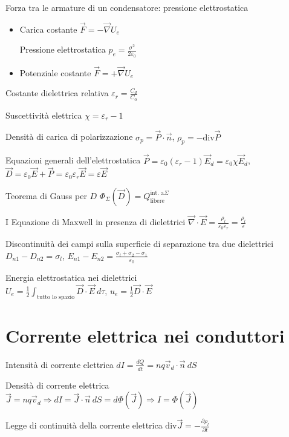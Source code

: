 \documentclass[10pt,a4paper]{article}
\begin{document}
\begin{multicols}{2}
Forza tra le armature di un condensatore: pressione elettrostatica
\begin{itemize}
\item Carica costante $\vec{F} =-\vec{\nabla } U_{e}$

Pressione elettrostatica $p_{e} =\frac{\sigma ^{2}}{2\varepsilon _{0}}$
\item Potenziale costante $\vec{F} =+\vec{\nabla } U_{e}$
\end{itemize}

Costante dielettrica relativa $\varepsilon _{r} =\frac{C_{d}}{C_{0}}$

Suscettività elettrica $\chi =\varepsilon _{r} -1$

Densità di carica di polarizzazione $\sigma _{p} =\vec{P} \cdot \vec{n}$, $\rho _{p} =-\text{div}\vec{P}$

Equazioni generali dell'elettrostatica $\vec{P} =\varepsilon _{0} (\varepsilon _{r} -1)\vec{E}_{d} =\varepsilon _{0} \chi \vec{E}_{d}$, $\vec{D} =\varepsilon _{0}\vec{E} +\vec{P} =\varepsilon _{0} \varepsilon _{r}\vec{E} =\varepsilon \vec{E}$

Teorema di Gauss per $D$ $\Phi _{\Sigma } (\vec{D} )=Q^{\text{int. a} \Sigma }_{\text{libere}}$

I Equazione di Maxwell in presenza di dielettrici $\vec{\nabla } \cdot \vec{E} =\frac{\rho _{l}}{\varepsilon _{0} \varepsilon _{r}} =\frac{\rho _{l}}{\varepsilon }$

Discontinuità dei campi sulla superficie di separazione tra due dielettrici $D_{n1} -D_{n2} =\sigma _{l}$, $E_{n1} -E_{n2} =\frac{\sigma _{l} +\sigma _{2} -\sigma _{1}}{\varepsilon _{0}}$

Energia elettrostatica nei dielettrici \\$U_{e} =\frac{1}{2}\int _{\text{tutto lo spazio}}\vec{D} \cdot \vec{E} \ d\tau $, $u_{e} =\frac{1}{2}\vec{D} \cdot \vec{E}$
\section*{Corrente elettrica nei conduttori}

Intensità di corrente elettrica $dI=\frac{dQ}{dt} =nq\vec{v}_{d} \cdot \vec{n} \ dS$

Densità di corrente elettrica \\$\vec{J} =nq\vec{v}_{d} \Longrightarrow dI=\vec{J} \cdot \vec{n} \ dS=d\Phi (\vec{J} )\Rightarrow I=\Phi (\vec{J} )$

Legge di continuità della corrente elettrica $\text{div}\vec{J} =-\frac{\partial \rho _{l}}{\partial t}$


\end{multicols}
\end{document}

